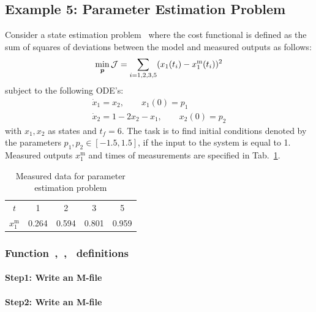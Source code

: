 \subsection{Example 5: Parameter Estimation Problem}
\label{sec:pep}

Consider a state estimation problem~\cite{fik02} where the cost
functional is defined as the sum of squares of deviations between the
model and measured outputs as follows:
\begin{equation}
\min_{\ve{p}} \mf{J} =
\sum_{i=1,2,3,5}(x_{1}(t_{i})-x_{1}^{\text{m}}(t_{i}))^{2}
\label{eq:pep}  
\end{equation}
subject to the following ODE's:
\begin{gather}
\dot{x}_{1} = x_{2}, \qquad x_{1}(0) = p_{1} \\
\dot{x}_{2} = 1 - 2x_{2} - x_{1}, \qquad x_{2}(0) = p_{2}
\end{gather} with $x_{1}, x_{2}$ as states and $t_f = 6$.
The task is to find initial conditions denoted by the parameters
$p_{1}, p_{2} \in [-1.5,1.5]$, if the input to the system is equal to
1. Measured outputs $x_{1}^{\text{m}}$ and times of measurements are
specified in Tab.~\ref{tab:measureddatas}.  

\begin{table}[h]
  \begin{center}
    \begin{tabular}{|c|c|c|c|c|}
      \hline
      $t$ & 1 & 2 & 3 & 5\\
      $x_{1}^{\text{m}}$ & 0.264 & 0.594 & 0.801 & 0.959\\
      \hline
    \end{tabular}
  \end{center}
  \caption{Measured data for parameter estimation problem}
  \label{tab:measureddatas} 
\end{table}
 
\subsubsection{Function~,~,~  definitions}

\paragraph{Step1: Write an M-file }

{\small }

\paragraph{Step2: Write an M-file~}

